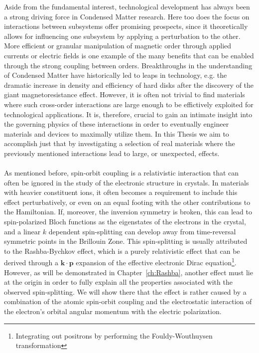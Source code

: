 Aside from the fundamental interest, technological development has always been a strong driving force in Condensed Matter research. Here too does the focus on interactions between subsystems offer promising prospects, since it theoretically allows for influencing one subsystem by applying a perturbation to the other.
More efficient or granular manipulation of magnetic order through applied currents or electric fields is one example of the many benefits that can be enabled through the strong coupling between orders.
Breakthroughs in the understanding of Condensed Matter have historically led to leaps in technology, e.g. the dramatic increase in density and efficiency of hard disks after the discovery of the giant magnetoresistance effect.
However, it is often not trivial to find materials where such cross-order interactions are large enough to be effictively exploited for technological applications.
It is, therefore, crucial to gain an intimate insight into the governing physics of these interactions in order to eventually engineer materials and devices to maximally utilize them.
In this Thesis we aim to accomplish just that by investigating a selection of real materials where the previously mentioned interactions lead to large, or unexpected, effects.
\\\\
As mentioned before, spin-orbit coupling is a relativistic interaction that can often be ignored in the study of the electronic structure in crystals.
In materials with heavier constituent ions, it often becomes a requirement to include this effect perturbatively, or even on an equal footing with the other contributions to the Hamiltonian.
If, moreover, the inversion symmetry is broken, this can lead to spin-polarized Bloch functions as the eigenstates of the electrons in the crystal, and a linear $k$ dependent spin-splitting can develop away from time-reversal symmetric points in the Brillouin Zone.
This spin-splitting is usually attributed to the Rashba-Bychkov effect, which is a purely relativistic effect that can be derived through a $\bm{k}\cdot \bm{p}$ expansion of the effective electronic Dirac equation\footnote{Integrating out positrons by performing the Fouldy-Wouthuysen transformation}.
However, as will be demonstrated in Chapter~\ref{ch:Rashba}, another effect must lie at the origin in order to fully explain  all the properties associated with the observed spin-splitting.
We will show there that the effect is rather caused by a combination of the atomic spin-orbit coupling and the electrostatic interaction of the electron's orbital angular momentum with the electric polarization.
